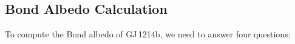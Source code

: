\documentclass[pdflatex,sn-standardnature]{sn-jnl}%
\begin{document}


\subsection*{Bond Albedo Calculation}

To compute the Bond albedo of GJ\,1214b, we need to answer four questions:
\end{document}
